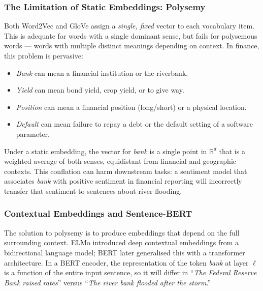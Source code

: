 \begin{deepdive}
\subsubsection{The Limitation of Static Embeddings: Polysemy}

Both Word2Vec and GloVe assign a \emph{single, fixed} vector to each
vocabulary item.  This is adequate for words with a single dominant
sense, but fails for polysemous words — words with multiple distinct
meanings depending on context.  In finance, this problem is pervasive:
\begin{itemize}
  \item \emph{Bank} can mean a financial institution or the riverbank.
  \item \emph{Yield} can mean bond yield, crop yield, or to give way.
  \item \emph{Position} can mean a financial position (long/short) or
        a physical location.
  \item \emph{Default} can mean failure to repay a debt or the
        default setting of a software parameter.
\end{itemize}
Under a static embedding, the vector for \emph{bank} is a single
point in $\mathbb{R}^d$ that is a weighted average of both senses,
equidistant from financial and geographic contexts.  This conflation
can harm downstream tasks: a sentiment model that associates
\emph{bank} with positive sentiment in financial reporting will
incorrectly transfer that sentiment to sentences about river flooding.

\subsubsection{Contextual Embeddings and Sentence-BERT}

The solution to polysemy is to produce embeddings that depend on the full
surrounding context.  ELMo \cite{peters2018} %
introduced deep contextual embeddings from a bidirectional language
model; BERT \cite{devlin2019} %
later generalised this with a transformer architecture.  In a BERT
encoder, the representation of the token \emph{bank} at layer $\ell$
is a function of the entire input sentence, so it will differ in
``\emph{The Federal Reserve Bank raised rates}'' versus
``\emph{The river bank flooded after the storm}.''


\end{deepdive}
